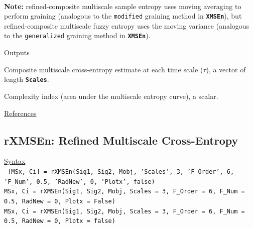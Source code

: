 \documentclass[12pt, a4paper, titlepage, openany]{book}
\begin{document}
\ \\ \textbf{Note:} refined-composite multiscale sample entropy uses moving averaging to perform graining (analogous to the \texttt{modified} graining method in \texttt{\textbf{XMSEn}}), but refined-composite multiscale fuzzy entropy uses the moving variance (analogous to the \texttt{generalized} graining method in \texttt{\textbf{XMSEn}}). 

\noindent \ul{Outputs}
\begin{description}[labelsep=1cm, labelwidth=2cm, nosep, style=multiline,leftmargin=3cm]\footnotesize
\item[\texttt{MSx}]		Composite multiscale cross-entropy estimate at each time scale ($\tau$), a vector of length \textbf{\texttt{Scales}}.
\item[\texttt{Ci}]		Complexity index (area under the multiscale entropy curve), a scalar.
\end{description}

\noindent \ul{References}\hspace{1cm}
\cite{XMS1} \cite{XMS2} \cite{XMS3} \cite{XMS4} \cite{cMS1} \cite{cMS3}



\newpage
\subsection{\normalsize rXMSEn: \hspace{15mm} Refined Multiscale Cross-Entropy}
\noindent\ul{Syntax} \vspace{6mm} \\ \noindent \texttt{\footnotesize
[MSx, Ci] = rXMSEn(Sig1, Sig2, Mobj, 'Scales', 3, 'F\_Order', 6, 'F\_Num', 0.5, 'RadNew', 0, ‘Plotx’, false)\\
MSx, Ci = rXMSEn(Sig1, Sig2, Mobj, Scales = 3, F\_Order = 6, F\_Num = 0.5, RadNew = 0, Plotx = False)\\ 
MSx, Ci = rXMSEn(Sig1, Sig2, Mobj, Scales = 3, F\_Order = 6, F\_Num = 0.5, RadNew = 0, Plotx = false)}
\end{document}
